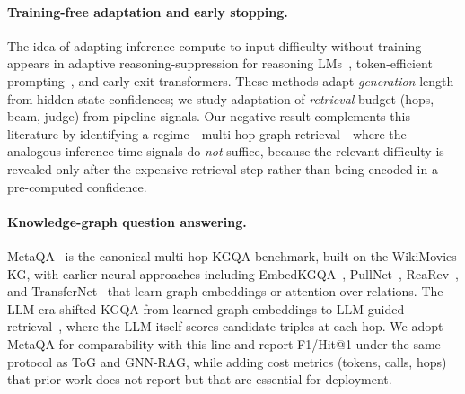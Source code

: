 \paragraph{Training-free adaptation and early stopping.}
The idea of adapting inference compute to input difficulty without training appears in adaptive reasoning-suppression for reasoning LMs~\cite{zheng2025adaptive}, token-efficient prompting~\cite{shah2026crop}, and early-exit transformers. These methods adapt \emph{generation} length from hidden-state confidences; we study adaptation of \emph{retrieval} budget (hops, beam, judge) from pipeline signals. Our negative result complements this literature by identifying a regime---multi-hop graph retrieval---where the analogous inference-time signals do \emph{not} suffice, because the relevant difficulty is revealed only after the expensive retrieval step rather than being encoded in a pre-computed confidence.

\paragraph{Knowledge-graph question answering.}
MetaQA~\cite{zhang2017variational} is the canonical multi-hop KGQA benchmark, built on the WikiMovies KG, with earlier neural approaches including EmbedKGQA~\cite{saxena2020improving}, PullNet~\cite{sun2019pullnet}, ReaRev~\cite{mavromatis2022rearev}, and TransferNet~\cite{shi2021transfernet} that learn graph embeddings or attention over relations. The LLM era shifted KGQA from learned graph embeddings to LLM-guided retrieval~\cite{sun2023thinkongraph,li2023fewshot,mavromatis2025gnnrag}, where the LLM itself scores candidate triples at each hop. We adopt MetaQA for comparability with this line and report F1/Hit@1 under the same protocol as ToG and GNN-RAG, while adding cost metrics (tokens, calls, hops) that prior work does not report but that are essential for deployment.
